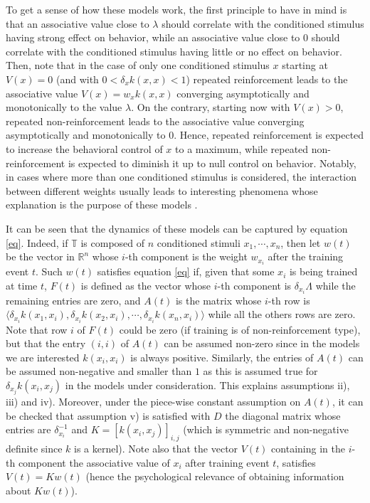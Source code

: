 \documentclass[]{interact}
\theoremstyle{plain}%
\theoremstyle{definition}
\theoremstyle{remark}
\begin{document}
To get a sense of how these models work, the first principle to have in mind is that an associative value close to $\lambda$ should correlate with the conditioned stimulus having strong effect on behavior, while an associative value close to $0$ should correlate with the conditioned stimulus having little or no effect on behavior.
Then, note that in the case of only one conditioned stimulus $x$ starting at $V(x)=0$ (and with $0<\delta_xk(x,x)<1$) repeated reinforcement leads to the associative value $V(x)=w_xk(x,x)$ converging asymptotically and monotonically to the value $\lambda$. On the contrary, starting now with $V(x)>0$, repeated non-reinforcement leads to the associative value converging asymptotically and monotonically to $0$. Hence, repeated reinforcement is expected to increase the behavioral control of $x$ to a maximum, while repeated non-reinforcement is expected to diminish it up to null control on behavior.
Notably, in cases where more than one conditioned stimulus is considered, the interaction between different weights usually leads to interesting phenomena whose explanation is the purpose of these models \cite{WM97,ME02}.

It can be seen that the dynamics of these models can be captured by equation \eqref{eq}. Indeed, if $\mathbb{T}$ is composed of $n$ conditioned stimuli $x_1,\cdots,x_n$, then let $w(t)$ be the vector in $\mathbb{R}^n$ whose $i$-th component is the weight $w_{x_i}$ after the training event $t$. 
Such $w(t)$ satisfies equation \eqref{eq} if, given that some $x_i$ is being trained at time $t$, $F(t)$ is defined as the vector whose $i$-th component is $\delta_{x_i}\Lambda$ while the remaining entries are zero, and $A(t)$ is the matrix whose $i$-th row is $\langle \delta_{x_i}k(x_1,x_i),\delta_{x_i}k(x_2,x_i),\cdots, \delta_{x_i}k(x_n,x_i)\rangle$ while all the others rows are zero. Note that row $i$ of $F(t)$ could be zero (if training is of non-reinforcement type), but that the entry $(i,i)$ of $A(t)$ can be assumed non-zero since in the models we are interested $k(x_i,x_i)$ is always positive. Similarly, the entries of $A(t)$ can be assumed non-negative and smaller than $1$ as this is assumed true for $\delta_{x_j}k(x_i,x_j)$ in the models under consideration. This explains assumptions ii), iii) and iv). Moreover, under the piece-wise constant assumption on $A(t)$, it can be checked that assumption v) is satisfied with $D$ the diagonal matrix whose entries are $\delta_{x_i}^{-1}$ and $K=[k(x_i,x_j)]_{i,j}$ (which is symmetric and non-negative definite since $k$ is a kernel). Note also that the vector $V(t)$ containing in the $i$-th component the associative value of $x_i$ after training event $t$, satisfies $V(t)=Kw(t)$ (hence the psychological relevance of obtaining information about $Kw(t)$). 
\end{document}
